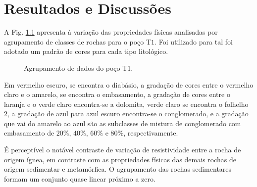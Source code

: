 \chapter{Resultados e Discussões}

A Fig. \ref{clusterT1} apresenta à variação das propriedades físicas analisadas por agrupamento de classes de rochas para o poço T$1$. Foi utilizado para tal foi adotado um padrão de cores para cada tipo litológico. 

\begin{figure}[H]
	\centering
	\setlength{\fboxsep}{8pt}
	\setlength{\fboxrule}{0.1pt}
	\caption{Agrupamento de dados do poço T1.}
	\label{clusterT1}
\end{figure} 

Em vermelho escuro, se encontra o diabásio, a gradação de cores entre o vermelho claro e o amarelo, se encontra o embasamento, a gradação de cores entre o laranja e o verde claro encontra-se a dolomita, verde claro se encontra o folhelho $2$, a gradação de azul para azul escuro encontra-se o conglomerado, e a gradação que vai do amarelo ao azul são as subclasses de mistura de conglomerado com embasamento de $20\%$, $40\%$, $60\%$ e $80\%$, respectivamente.

É perceptível o notável contraste de variação de resistividade entre a rocha de origem ígnea, em contraste com as propriedades físicas das demais rochas de origem sedimentar e metamórfica. O agrupamento das rochas sedimentares formam um conjunto quase linear próximo a zero.

